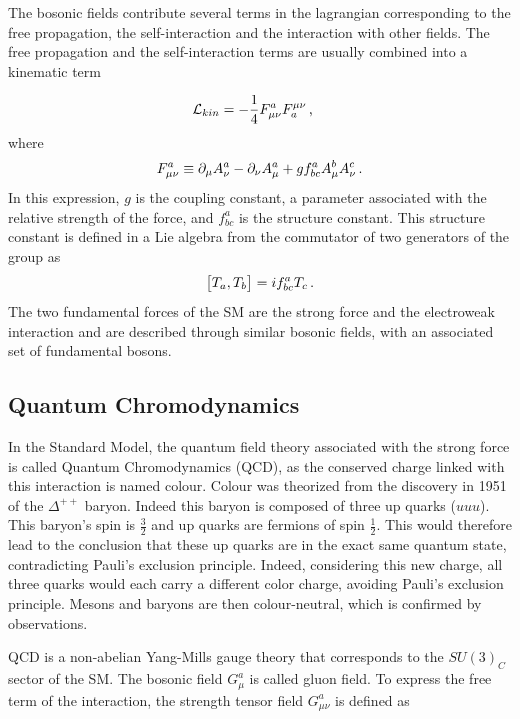 The bosonic fields contribute several terms in the lagrangian corresponding to the free propagation, the self-interaction and the interaction with other fields. The free propagation and the self-interaction terms are usually combined into a kinematic term

\begin{equation}
    \Lagr_{kin} = -\frac{1}{4}F^{a}_{\mu\nu}F_{a}^{\mu\nu} \msep
\end{equation}
where
\begin{equation}
    F^{a}_{\mu\nu} \equiv \partial_{\mu}A_{\nu}^a - \partial_{\nu}A_{\mu}^a + g f_{bc}^a A_{\mu}^b A_{\nu}^c \mend
\end{equation}
In this expression, $g$ is the coupling constant, a parameter associated with the relative strength of the force, and $f_{bc}^a$ is the structure constant. This structure constant is defined in a Lie algebra from the commutator of two generators of the group as
\begin{equation}
    \big[ T_a , T_b \big] = i f_{bc}^a T_c \mend
    \label{eq:commut}
\end{equation}
The two fundamental forces of the SM are the strong force and the electroweak interaction and are described through similar bosonic fields, with an associated set of fundamental bosons.

\subsection{Quantum Chromodynamics}
\label{sec:QCD}

In the Standard Model, the quantum field theory associated with the strong force is called Quantum Chromodynamics (QCD), as the conserved charge linked with this interaction is named colour. Colour was theorized from the discovery in 1951 of the $\Delta^{++}$ baryon. Indeed this baryon is composed of three up quarks ($uuu$). This baryon's spin is $\frac{3}{2}$ and up quarks are fermions of spin $\frac{1}{2}$. This would therefore lead to the conclusion that these up quarks are in the exact same quantum state, contradicting Pauli's exclusion principle. Indeed, considering this new charge, all three quarks would each carry a different color charge, avoiding Pauli's exclusion principle. Mesons and baryons are then colour-neutral, which is confirmed by observations.

QCD is a non-abelian Yang-Mills gauge theory that corresponds to the $SU(3)_C$ sector of the SM. The bosonic field $G_{\mu}^a$ is called gluon field. To express the free term of the interaction, the strength tensor field $G_{\mu\nu}^a$ is defined as

